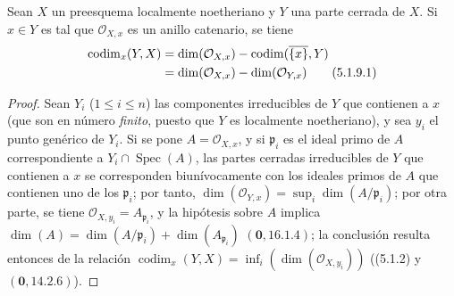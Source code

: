 \begin{proposition}[5.1.9]
\label{IV.2.5.1.9-fr}
Sean $X$ un preesquema localmente noetheriano y $Y$ una parte cerrada de $X$.
Si $x\in Y$ es tal que $\mathcal O_{X,x}$ es un anillo catenario, se tiene
\begin{align}
\operatorname{codim}_x(Y,X)
&=\dim(\mathcal O_{X,x})-\operatorname{codim}(\overline{\{x\}},Y)\notag\\
&=\dim(\mathcal O_{X,x})-\dim(\mathcal O_{Y,x})
\tag{5.1.9.1}\label{IV.2.5.1.9.1-fr}
\end{align}
\end{proposition}

\begin{proof}
Sean $Y_i$ ($1\leq i\leq n$) las componentes irreducibles de $Y$ que
contienen a $x$ (que son en número \emph{finito}, puesto que $Y$ es localmente
noetheriano), y sea $y_i$ el punto genérico de $Y_i$. Si se pone
$A=\mathcal O_{X,x}$, y si $\mathfrak p_i$ es el ideal primo de $A$
correspondiente a $Y_i\cap\operatorname{Spec}(A)$, las partes cerradas
irreducibles de $Y$ que contienen a $x$ se corresponden biunívocamente con
los ideales primos de $A$ que contienen uno de los $\mathfrak p_i$; por tanto,
$\dim(\mathcal O_{Y,x})=\sup_i\dim(A/\mathfrak p_i)$; por otra parte, se tiene
$\mathcal O_{X,y_i}=A_{\mathfrak p_i}$, y la hipótesis sobre $A$ implica
$\dim(A)=\dim(A/\mathfrak p_i)+\dim(A_{\mathfrak p_i})$ $(\mathbf{0},16.1.4)$; la
conclusión resulta entonces de la relación
$\operatorname{codim}_x(Y,X)=\inf_i(\dim(\mathcal O_{X,y_i}))$ ((5.1.2) y
$(\mathbf{0},14.2.6)$).
\end{proof}

